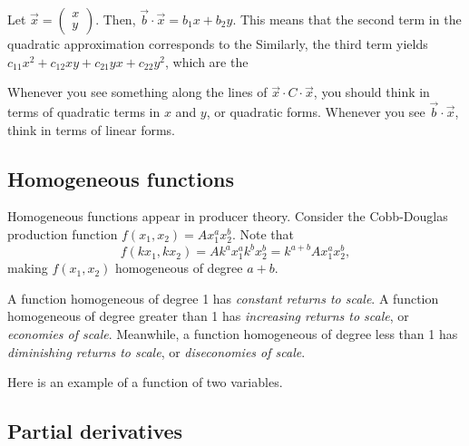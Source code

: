 \documentclass[a4paper, 12pt,oneside,openany]{book}
\begin{document}

 Let $\vec{x} = \begin{pmatrix} x \\ y \end{pmatrix}$. Then, $\vec{b} \cdot \vec{x} = b_1x + b_2y$. This means that the second term in the quadratic approximation corresponds to the  Similarly, the third term yields $c_{11}x^2+c_{12}xy+c_{21}yx+c_{22}y^2$, which are the 

 Whenever you see something along the lines of $\vec{x} \cdot C \cdot \vec{x}$, you should think in terms of quadratic terms in $x$ and $y$, or quadratic forms. Whenever you see $\vec{b} \cdot \vec{x}$, think in terms of linear forms.

\subsection{Homogeneous functions}


Homogeneous functions appear in producer theory. Consider the Cobb-Douglas production function $f(x_1, x_2) = Ax_1^ax_2^b$. Note that $$f(kx_1, kx_2) = Ak^ax_1^ak^bx_2^b = k^{a+b} Ax_1^ax_2^b,$$ making $f(x_1, x_2)$ homogeneous of degree $a+b$.

A function homogeneous of degree 1 has \emph{constant returns to scale}. A function homogeneous of degree greater than 1 has \emph{increasing returns to scale}, or \emph{economies of scale}. Meanwhile, a function homogeneous of degree less than 1 has \emph{diminishing returns to scale}, or \emph{diseconomies of scale}.

Here is an example of a function of two variables.


\subsection{Partial derivatives}
\end{document}
